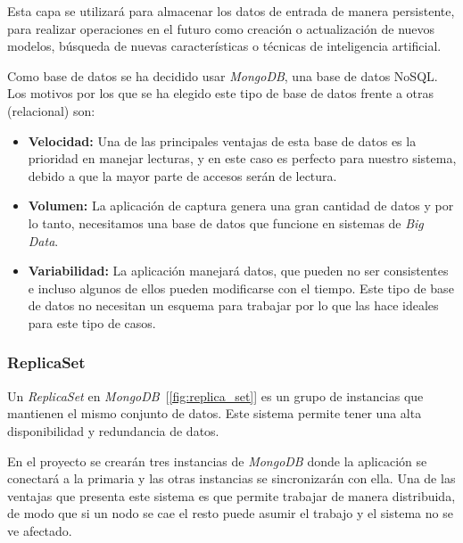 Esta capa se utilizará para almacenar los datos de entrada de manera persistente, para realizar operaciones en el futuro como creación o actualización de nuevos modelos, búsqueda de nuevas características o técnicas de inteligencia artificial.

Como base de datos se ha decidido usar \textit{MongoDB}, una base de datos NoSQL. Los motivos por los que se ha elegido este tipo de base de datos frente a otras (relacional) son:

\begin{itemize}[noitemsep]
    \item \textbf{Velocidad:} Una de las principales ventajas de esta base de datos es la prioridad en manejar lecturas, y en este caso es perfecto para nuestro sistema, debido a que la mayor parte de accesos serán de lectura.
    \item \textbf{Volumen:} La aplicación de captura genera una gran cantidad de datos y por lo tanto, necesitamos una base de datos que funcione en sistemas de \textit{Big Data}.
    \item \textbf{Variabilidad:} La aplicación manejará datos, que pueden no ser consistentes e incluso algunos de ellos pueden modificarse con el tiempo. Este tipo de base de datos no necesitan un esquema para trabajar por lo que las hace ideales para este tipo de casos.
\end{itemize}

\subsubsection{ReplicaSet}

Un \textit{ReplicaSet} en \textit{MongoDB}~[\cref{fig:replica_set}] es un grupo de instancias que mantienen el mismo conjunto de datos. Este sistema permite tener una alta disponibilidad y redundancia de datos.

En el proyecto se crearán tres instancias de \textit{MongoDB} donde la aplicación se conectará a la primaria y las otras instancias se sincronizarán con ella. Una de las ventajas que presenta este sistema es que permite trabajar de manera distribuida, de modo que si un nodo se cae el resto puede asumir el trabajo y el sistema no se ve afectado.




